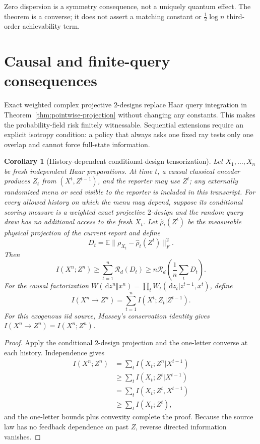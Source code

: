\documentclass[11pt,a4paper]{article}
\newtheorem{corollary}[theorem]{Corollary}
\theoremstyle{remark}
\newcommand{\E}{\mathbb{E}}
\newcommand{\cR}{\mathcal{R}}
\newcommand{\dd}{\,\mathrm{d}}
\begin{document}
Zero dispersion is a symmetry consequence, not a uniquely quantum effect.
The theorem is a converse; it does not assert a matching constant or
$\tfrac12\log n$ third-order achievability term.

\section{Causal and finite-query consequences}

Exact weighted complex projective $2$-designs replace Haar query integration
in Theorem~\ref{thm:pointwise-projection} without changing any constants.
This makes the probability-field risk finitely witnessable.  Sequential
extensions require an explicit isotropy condition: a policy that always asks
one fixed ray tests only one overlap and cannot force full-state information.

\begin{corollary}[History-dependent conditional-design tensorization]
\label{cor:causal}
Let $X_1,\ldots,X_n$ be fresh independent Haar preparations.  At time $t$, a
causal classical encoder produces $Z_t$ from $(X^t,Z^{t-1})$, and the reporter
may use $Z^t$; any externally randomized menu or seed visible to the reporter
is included in this transcript.  For every allowed history on which the menu may depend,
suppose its conditional scoring measure is a weighted exact projective
$2$-design and the random query draw has no additional access to the fresh
$X_t$.  Let $\widehat\rho_t(Z^t)$ be the measurable physical projection of
the current report and define
\begin{equation}
 D_t=\E\|\rho_{X_t}-\widehat\rho_t(Z^t)\|_F^2.
\end{equation}
Then
\begin{equation}
 I(X^n;Z^n)\ge\sum_{t=1}^n\cR_d(D_t)
 \ge n\cR_d\!\left(\frac1n\sum_tD_t\right).
 \label{eq:causal-bound}
\end{equation}
For the causal factorization
$W(\dd z^n\Vert x^n)=\prod_tW_t(\dd z_t|z^{t-1},x^t)$, define
\begin{equation}
 I(X^n\to Z^n)=\sum_{t=1}^n I(X^t;Z_t|Z^{t-1}).
\end{equation}
For this exogenous iid source, Massey's conservation identity
\cite{Massey1990Directed} gives $I(X^n\to Z^n)=I(X^n;Z^n)$.
\end{corollary}

\begin{proof}
Apply the conditional $2$-design projection and the one-letter converse at
each history.  Independence gives
\begin{align}
 I(X^n;Z^n)
 &=\sum_t I(X_t;Z^n|X^{t-1})\\
 &\ge\sum_t I(X_t;Z^t|X^{t-1})\\
 &=\sum_t I(X_t;Z^t,X^{t-1})\\
 &\ge\sum_t I(X_t;Z^t),
\end{align}
and the one-letter bounds plus convexity complete the proof.  Because the
source law has no feedback dependence on past $Z$, reverse directed
information vanishes.
\end{proof}
\end{document}
